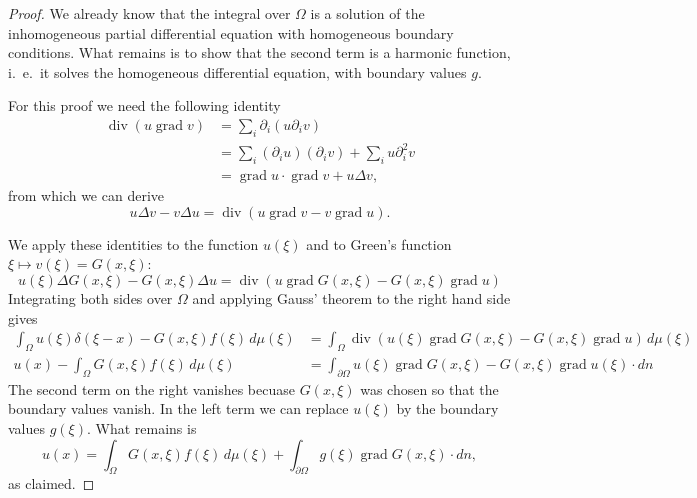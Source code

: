 \begin{proof}
We already know that the integral over $\Omega$ is a solution of the
inhomogeneous partial differential equation with homogeneous boundary
conditions.
What remains is to show that the second term is a harmonic function,
i.~e.~it solves the homogeneous differential equation,
with boundary values $g$.

For this proof we need the following identity
\begin{align*}
\operatorname{div}(u\operatorname{grad}v)
&=
\sum_i\partial_i(u\partial_iv)
\\
&=\sum_i(\partial_iu)(\partial_iv)+\sum_iu\partial_i^2v
\\
&=\operatorname{grad}u\cdot\operatorname{grad}v+u\Delta v,
\end{align*}
from which we can derive
\[
u\Delta v-v\Delta u
=
\operatorname{div}(u\operatorname{grad}v-v\operatorname{grad}u).
\]

We apply these identities to the function $u(\xi)$ and 
to Green's function $\xi\mapsto v(\xi)=G(x,\xi)$:
\[
u(\xi)\Delta G(x,\xi)-G(x,\xi)\Delta u
=
\operatorname{div}(u\operatorname{grad}G(x,\xi)-G(x,\xi)\operatorname{grad}u)
\]
Integrating both sides over $\Omega$ and applying Gauss' theorem to
the right hand side gives
\begin{align*}
\int_{\Omega}u(\xi)\delta(\xi - x)-G(x,\xi)f(\xi)\,d\mu(\xi)
&=
\int_{\Omega}\operatorname{div}(u(\xi)\operatorname{grad}G(x,\xi)-G(x,\xi)\operatorname{grad}u)\,d\mu(\xi)
\\
u(x)-\int_{\Omega}G(x,\xi)f(\xi)\,d\mu(\xi)
&=\int_{\partial \Omega}u(\xi)\operatorname{grad}G(x,\xi)-G(x,\xi)\operatorname{grad}u(\xi)\cdot dn
\end{align*}
The second term on the right vanishes becuase $G(x,\xi)$ was chosen so
that the boundary values vanish.
In the left term we can replace $u(\xi)$ by the boundary values $g(\xi)$.
What remains is
\[
u(x)
=
\int_{\Omega}G(x,\xi)f(\xi)\,d\mu(\xi)
+
\int_{\partial\Omega}g(\xi)\operatorname{grad}G(x,\xi)\cdot dn,
\]
as claimed.
\end{proof}

